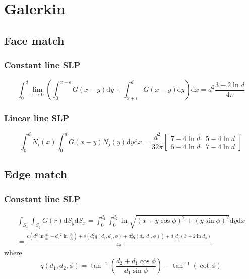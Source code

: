 \documentclass[a4paper,11pt]{article}
\newcommand{\td}{\mathrm{d}}
\begin{document}
\section{Galerkin}

\subsection{Face match}

\subsubsection{Constant line SLP}

\begin{equation}
\int_{0}^{d}
\lim_{\epsilon \to 0}
\left(
\int_{0}^{x-\epsilon} G(x-y) \td y
+
\int_{x+\epsilon}^{d} G(x-y) \td y
\right)
\td x
=
d^2\frac{3-2\ln d}{4\pi}
\end{equation}

\subsubsection{Linear line SLP}

\begin{equation}
\int_{0}^{d} N_i(x) \int_{0}^{d} G(x-y) N_j(y) \td y \td x
=
\frac{d^2}{32\pi} \begin{bmatrix}
7-4 \ln d & 5 - 4 \ln d \\
5-4 \ln d & 7 - 4 \ln d
\end{bmatrix}
\end{equation}

\subsection{Edge match}

\subsubsection{Constant line SLP}

\begin{multline}
\int_{S_{x}} \int_{S_{y}} G(r) \td S_y \td S_x =
\int_{0}^{d_1} \int_{0}^{d_2}
\ln \sqrt{(x+y \cos\phi)^2 + (y\sin\phi)^2}
\td y \td x \\
=
\frac{
c \left(d_1^2 \ln \frac{d_1}{d_3} + {d_2}^2 \ln \frac{d_2}{d_3}\right)
+ s \left(d_1^2 q(d_1, d_2, \phi) + d_2^2 q(d_2, d_1, \phi)\right)
+ d_1 d_2 \left(3 - 2 \ln d_3 \right)
}{
4 \pi
}
\end{multline}
%
where
%
\begin{equation}
q(d_1, d_2, \phi) = \tan^{-1}\left(\frac{d_2 + d_1 \cos\phi}{d_1 \sin\phi}\right) - \tan^{-1}\left(\cot\phi\right)
\end{equation}
\end{document}
